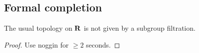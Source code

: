 \subsection{Formal completion}

\begin{exer}
	The usual topology on $\mathbf{R}$ is not given by a subgroup filtration.
\end{exer}
\begin{proof}
	Use noggin for $\geq 2$ seconds.
\end{proof}
